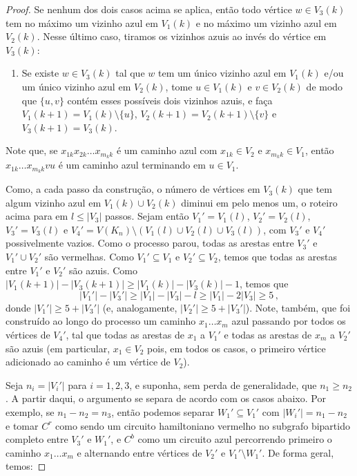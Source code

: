 \begin{proof}
	Se nenhum dos dois casos acima se aplica, então todo vértice $w\in V_3(k)$ tem no máximo um vizinho azul em $V_1(k)$ e no máximo um vizinho azul em $V_2(k)$. Nesse último caso, tiramos os vizinhos azuis ao invés do vértice em $V_3(k)$:
	\begin{enumerate}
		\item Se existe $w\in V_3(k)$ tal que $w$ tem um único vizinho azul em $V_1(k)$ e/ou um único vizinho azul em $V_2(k)$, tome $u\in V_1(k)$ e $v\in V_2(k)$ de modo que $\{u,v\}$ contém esses possíveis dois vizinhos azuis, e faça $V_1(k+1) = V_1(k)\setminus\{u\}$, $V_2(k+1) = V_2(k+1)\setminus\{v\}$ e $V_3(k+1) = V_3(k)$.
	\end{enumerate}
	Note que, se $x_{1k}x_{2k}\dots x_{m_kk}$ é um caminho azul com $x_{1k}\in V_2$ e $x_{m_kk}\in V_1$, então $x_{1k}\dots x_{m_kk}vu$ é um caminho azul terminando em $u\in V_1$.
	
	Como, a cada passo da construção, o número de vértices em $V_3(k)$ que tem algum vizinho azul em $V_1(k)\cup V_2(k)$ diminui em pelo menos um, o roteiro acima para em $l\leq |V_3|$ passos. Sejam então $V_1' = V_1(l)$, $V_2' = V_2(l)$, $V_3' = V_3(l)$ e $V_4' = V(K_n)\setminus (V_1(l)\cup V_2(l)\cup V_3(l))$, com $V_3'$ e $V_4'$ possivelmente vazios. Como o processo parou, todas as arestas entre $V_3'$ e $V_1'\cup V_2'$ são vermelhas. Como $V_1'\subseteq V_1$ e $V_2'\subseteq V_2$, temos que todas as arestas entre $V_1'$ e $V_2'$ são azuis. Como $|V_1(k+1)| - |V_3(k+1)|\geq |V_1(k)| - |V_3(k)| - 1$, temos que 
	\[
		|V_1'| - |V_3'| \geq |V_1| - |V_3| - l \geq |V_1| - 2|V_3| \geq 5\,,
	\]
	donde $|V_1'|\geq 5 + |V_3'|$ (e, analogamente, $|V_2'|\geq 5 + |V_3'|$). Note, também, que foi construído ao longo do processo um caminho $x_1\dots x_m$ azul passando por todos os vértices de $V_4'$, tal que todas as arestas de $x_1$ a $V_1'$ e todas as arestas de $x_m$ a $V_2'$ são azuis (em particular, $x_1\in V_2$ pois, em todos os casos, o primeiro vértice adicionado ao caminho é um vértice de $V_2$).
	
	Seja $n_i = |V_i'|$ para $i=1,2,3$, e suponha, sem perda de generalidade, que $n_1\geq n_2$. A partir daqui, o argumento se separa de acordo com os casos abaixo. Por exemplo, se $n_1-n_2 = n_3$, então podemos separar $W_1'\subseteq V_1'$ com $|W_i'| = n_1-n_2$ e tomar $C^r$ como sendo um circuito hamiltoniano vermelho no subgrafo bipartido completo entre $V_3'$ e $W_1'$, e $C^b$ como um circuito azul percorrendo primeiro o caminho $x_1\dots x_m$ e alternando entre vértices de $V_2'$ e $V_1'\setminus W_1'$. De forma geral, temos:
	

\end{proof}
